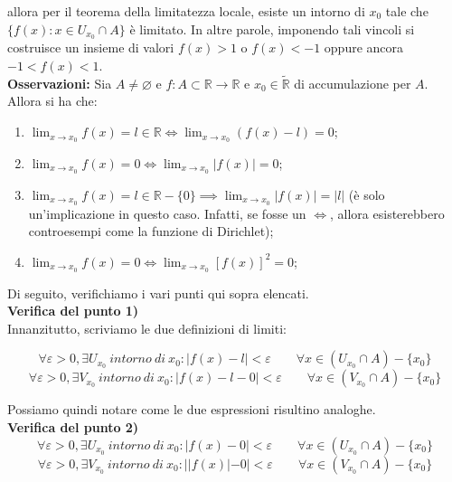 \documentclass{article}
\begin{document}
\noindent allora per il teorema della limitatezza locale, esiste un intorno di $x_0$ tale che $\{f(x) : x \in U_{x_0} \cap A\}$ è limitato. In altre parole, imponendo tali vincoli si costruisce un insieme di valori $f(x) > 1$ o $f(x) < -1$ oppure ancora $-1 < f(x) < 1$. \\

\noindent\textbf{Osservazioni:} Sia $A \neq \varnothing$ e $f: A \subset \mathbb{R} \xrightarrow{} \mathbb{R}$ e $x_0 \in \widetilde{\mathbb{R}}$ di accumulazione per $A$. Allora si ha che:

\begin{enumerate}
    \item $\lim_{x \to x_0} f(x) = l \in \mathbb{R} \iff \lim_{x \to x_0} (f(x) - l) = 0$;
    \item $\lim_{x \to x_0} f(x) = 0 \iff \lim_{x \to x_0} |f(x)| = 0$;
    \item $\lim_{x \to x_0} f(x) = l \in \mathbb{R} - \{0\} \implies \lim_{x \to x_0} |f(x)| = |l|$ (è solo un'implicazione in questo caso. Infatti, se fosse un $\iff$, allora esisterebbero controesempi come la funzione di Dirichlet);
    \item $\lim_{x \to x_0} f(x) = 0 \iff \lim_{x \to x_0} [f(x)]^2 = 0$;
\end{enumerate}

\noindent Di seguito, verifichiamo i vari punti qui sopra elencati. \\

\noindent\textbf{Verifica del punto 1)}\\
\noindent Innanzitutto, scriviamo le due definizioni di limiti:

\begin{equation*}
    \forall \varepsilon > 0, \exists U_{x_0} \ intorno \ di \ x_0 : |f(x) - l| < \varepsilon \qquad \forall x \in (U_{x_0} \cap A) - \{x_0\}
\end{equation*}
\begin{equation*}
    \forall \varepsilon > 0, \exists V_{x_0} \ intorno \ di \ x_0 : |f(x) - l - 0| < \varepsilon \qquad \forall x \in (V_{x_0} \cap A) - \{x_0\}
\end{equation*}

\noindent Possiamo quindi notare come le due espressioni risultino analoghe.\\

\noindent\textbf{Verifica del punto 2)}\\
\begin{equation*}
    \forall \varepsilon > 0, \exists U_{x_0} \ intorno \ di \ x_0 : |f(x) - 0| < \varepsilon \qquad \forall x \in (U_{x_0} \cap A) - \{x_0\}
\end{equation*}
\begin{equation*}
    \forall \varepsilon > 0, \exists V_{x_0} \ intorno \ di \ x_0 : ||f(x)| - 0| < \varepsilon \qquad \forall x \in (V_{x_0} \cap A) - \{x_0\}
\end{equation*}
\end{document}

